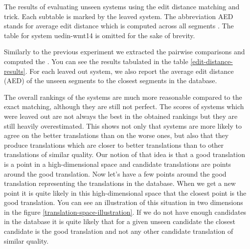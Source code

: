 \begin{table}
\caption[Results of evaluating unseen systems by edit distance matching]{The results of
  evaluating unseen systems using the edit distance matching and
   trick. Each subtable is marked by the leaved system.
  The abbreviation AED stands for average edit distance which is computed
across all segments . The table for system uedin-wmt14 is omitted for the sake
of brevity.}

  \label{edit-distance-results}
\end{table}

Similarly to the previous experiment we extracted the pairwise comparisons and
computed the . You can see the results
tabulated in the table \ref{edit-distance-results}. For each leaved out system,
we also report the average edit distance (AED) of the unseen segments to the closest
segments in the database.

The overall rankings of the systems are much more reasonable compared to the
exact matching, although they are still not perfect. The scores of systems
which were leaved out are not always the best in the obtained rankings but they
are still heavily overestimated. This shows not only that systems are more
likely to agree on the better translations than on the worse ones, but also
that they produce translations which are closer to better translations than to
other translations of similar quality. Our notion of that idea is that a good
translation is a point  in a high-dimensional space and candidate translations
are points around the good translation. Now let's have a few points around the
good translation representing the translations in the database. When we get a
new point it is quite likely in this high-dimensional space that the closest
point is the good translation. You can see an illustration of this situation in
two dimensions in the figure \ref{translation-space-illustration}.  If we do not have enough candidates in the
database it is quite likely that for a given unseen candidate the closest
candidate is the good translation and not any other candidate translation of
similar quality. 

